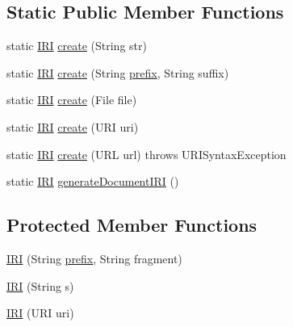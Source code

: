 \subsection*{Static Public Member Functions}
\begin{DoxyCompactItemize}
\item 
static \hyperlink{classorg_1_1semanticweb_1_1owlapi_1_1model_1_1_i_r_i}{I\-R\-I} \hyperlink{classorg_1_1semanticweb_1_1owlapi_1_1model_1_1_i_r_i_a689f56b17fd566c81d3d654efd7bfe0d}{create} (String str)
\item 
static \hyperlink{classorg_1_1semanticweb_1_1owlapi_1_1model_1_1_i_r_i}{I\-R\-I} \hyperlink{classorg_1_1semanticweb_1_1owlapi_1_1model_1_1_i_r_i_ae863640ba5e7e06909fe688cfabc785d}{create} (String \hyperlink{classorg_1_1semanticweb_1_1owlapi_1_1model_1_1_i_r_i_ae212f6c771cdd6c681af5d027f4a21de}{prefix}, String suffix)
\item 
static \hyperlink{classorg_1_1semanticweb_1_1owlapi_1_1model_1_1_i_r_i}{I\-R\-I} \hyperlink{classorg_1_1semanticweb_1_1owlapi_1_1model_1_1_i_r_i_a489ec57d61acdb7643b82ce9c454c046}{create} (File file)
\item 
static \hyperlink{classorg_1_1semanticweb_1_1owlapi_1_1model_1_1_i_r_i}{I\-R\-I} \hyperlink{classorg_1_1semanticweb_1_1owlapi_1_1model_1_1_i_r_i_a09183f8539b03cdb2abf6eae749bf5bc}{create} (U\-R\-I uri)
\item 
static \hyperlink{classorg_1_1semanticweb_1_1owlapi_1_1model_1_1_i_r_i}{I\-R\-I} \hyperlink{classorg_1_1semanticweb_1_1owlapi_1_1model_1_1_i_r_i_a1ed7e79cbb9078d6dcef7b5d82990402}{create} (U\-R\-L url)  throws U\-R\-I\-Syntax\-Exception 
\item 
static \hyperlink{classorg_1_1semanticweb_1_1owlapi_1_1model_1_1_i_r_i}{I\-R\-I} \hyperlink{classorg_1_1semanticweb_1_1owlapi_1_1model_1_1_i_r_i_af72d8f299944fb87ade02e6c22e5fa6f}{generate\-Document\-I\-R\-I} ()
\end{DoxyCompactItemize}
\subsection*{Protected Member Functions}
\begin{DoxyCompactItemize}
\item 
\hyperlink{classorg_1_1semanticweb_1_1owlapi_1_1model_1_1_i_r_i_a527a37dc8f04c77e6d7551070c9b049f}{I\-R\-I} (String \hyperlink{classorg_1_1semanticweb_1_1owlapi_1_1model_1_1_i_r_i_ae212f6c771cdd6c681af5d027f4a21de}{prefix}, String fragment)
\item 
\hyperlink{classorg_1_1semanticweb_1_1owlapi_1_1model_1_1_i_r_i_af323ee2bade8a1a01cb10d88b5f9f924}{I\-R\-I} (String s)
\item 
\hyperlink{classorg_1_1semanticweb_1_1owlapi_1_1model_1_1_i_r_i_a50d8ef038e5b08c51805deba43051801}{I\-R\-I} (U\-R\-I uri)
\end{DoxyCompactItemize}
